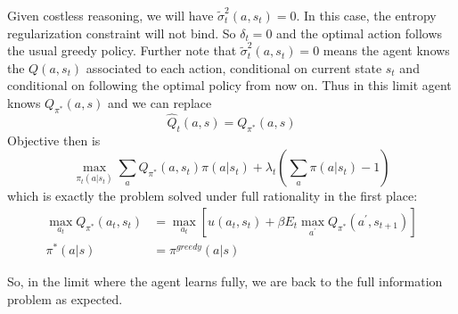 \documentclass[12pt]{article}%
\begin{document}
Given costless reasoning, we will have $\widetilde\sigma_{t}^{2}(a,s_{t})=0.$
In this case, the entropy regularization constraint will not bind. So
$\delta_{t}=0$ and the optimal action follows the usual greedy policy. Further
note that $\widetilde\sigma_{t}^{2}(a,s_{t})=0$ means the agent knows the
$Q(a,s_{t})$ associated to each action, conditional on current state $s_{t}$
and conditional on following the optimal policy from now on. Thus in this
limit agent knows $Q_{\pi^{\ast}}(a, s)$ and we can replace%
\[
\widehat{Q}_{t}(a,s)=Q_{\pi^{\ast}}(a,s )
\]
Objective then is%
\[
\max_{\pi_{t}(a|s_{t})}\sum_{a}Q_{\pi^{\ast}}(a, s_{t})\pi(a|s_{t}%
)+\lambda_{t} (\sum_{a}\pi(a|s_{t})-1)
\]
which is exactly the problem solved under full rationality in the first
place:
\begin{align*}
\max_{a_{t}}Q_{\pi^{\ast}}(a_{t}, s_{t})  &  =\max_{a_{t}}\left[  u(a_{t},
s_{t})+\beta E_{t}\max_{a^{\prime}}Q_{\pi^{\ast}}(a^{\prime}, s_{t+1})\right]
\\
\pi^{\ast}(a|s)  &  =\pi^{greedy}(a|s)
\end{align*}


So, in the limit where the agent learns fully, we are back to the full
information problem as expected.
\end{document}
